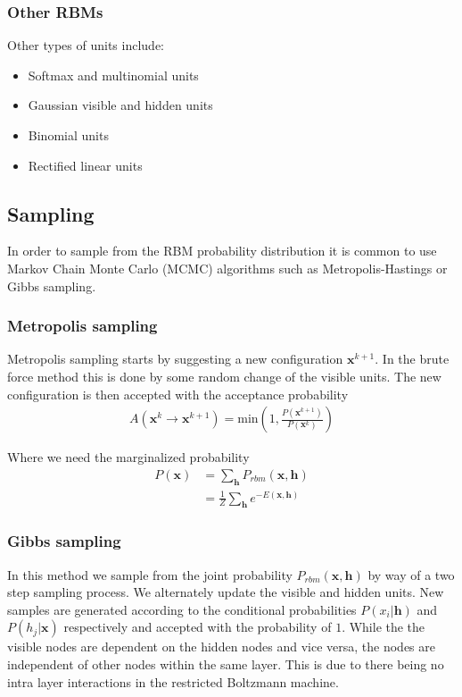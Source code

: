 \documentclass[norsk,a4paper,11pt]{article}
\newcommand{\Vx}{\mathbf{x}}
\newcommand{\Vh}{\mathbf{h}}
\begin{document}
\subsubsection{Other RBMs}
Other types of units include:
\begin{itemize}
	\item Softmax and multinomial units
	\item Gaussian visible and hidden units
	\item Binomial units
	\item Rectified linear units
\end{itemize}

\subsection{Sampling}
In order to sample from the RBM probability distribution it is common to use Markov Chain Monte Carlo (MCMC) algorithms such as Metropolis-Hastings or Gibbs sampling.

\subsubsection{Metropolis sampling}
Metropolis sampling starts by suggesting a new configuration $\bm{x}^{k+1}$. In the brute force method this is done by some random change of the visible units. The new configuration is then accepted with the acceptance probability
\begin{align}
	A(\bm{x}^k \rightarrow \bm{x}^{k+1}) = \text{min} (1, \frac{P(\bm{x}^{k+1})}{P(\bm{x}^k)})
\end{align} 

Where we need the marginalized probability
\begin{align}
	P(\bm{x})  &= \sum_\mathbf{h} P_{rbm}(\mathbf{x}, \mathbf{h}) \\
				&= \frac{1}{Z}\sum_\mathbf{h} e^{-E(\mathbf{x}, \mathbf{h})}
\end{align}

\subsubsection{Gibbs sampling}
In this method we sample from the joint probability $P_{rbm} (\Vx, \Vh)$ by way of a two step sampling process. We alternately update the visible and hidden units.
New samples are generated according to the conditional probabilities $P(x_i|\Vh)$ and $P(h_j|\Vx)$ respectively and accepted with the probability of $1$. While the the visible nodes are dependent on the hidden nodes and vice versa, the nodes are independent of other nodes within the same layer. This is due to there being no intra layer interactions in the restricted Boltzmann machine.
\end{document}
